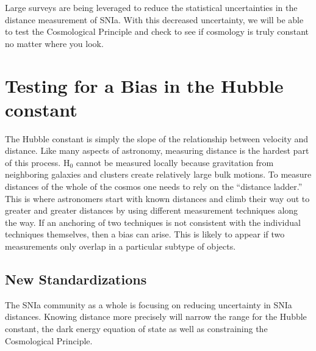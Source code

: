 \documentclass[apj, iop]{emulateapj}
\newcommand{\sn}{SNIa}
\newcommand{\Hubble}{\ensuremath{\text{H}_0}}
\begin{document}

Large surveys are being leveraged to reduce the statistical uncertainties in the
distance measurement of \sn{}. With this decreased uncertainty, we will be able
to test the Cosmological Principle and check to see if cosmology is truly
constant no matter where you look.

\section{Testing for a Bias in the Hubble constant} %
\label{sec:Hubble_Bias}

The Hubble constant is simply the slope of the relationship between velocity and
distance. Like many aspects of astronomy, measuring distance is the hardest part
of this process. \Hubble{} cannot be measured locally because gravitation from
neighboring galaxies and clusters create relatively large bulk motions. To
measure distances of the whole of the cosmos one needs to rely on the
``distance ladder.''  This is where astronomers start with known distances and
climb their way out to greater and greater distances by using different
measurement techniques along the way. If an anchoring of two techniques is not
consistent with the individual techniques themselves, then a bias can arise.
This is likely to appear if two measurements only overlap in a particular
subtype of objects.

\subsection{New Standardizations}\label{new-standardizations}

The \sn{} community as a whole is focusing on reducing uncertainty in \sn{}
distances. Knowing distance more precisely will narrow the range for the Hubble
constant, the dark energy equation of state as well as constraining the
Cosmological Principle.
\end{document}
